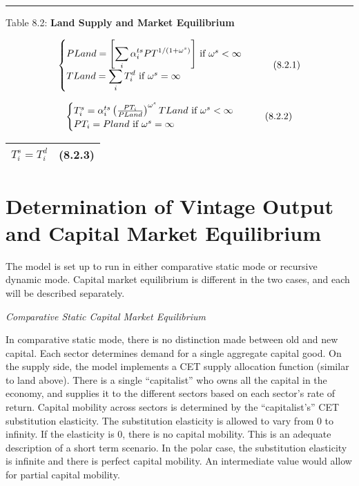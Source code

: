 \documentclass{article}
\begin{document}
\noindent\rule{\linewidth}{0.4pt}
\begin{center}
\begin{large}
{\centering Table 8.2: \textbf{Land Supply and Market Equilibrium} \par}

\begin{equation}
    \begin{cases}
      $$PLand = \left[\displaystyle \sum_i \alpha^{ts}_i PT^{1/(1+\omega^s)} \right]$$ \text{ if } $$\omega^s < \infty$$\\
      $$TLand = \displaystyle \sum_i T^d_i$$ \text{ if } $$\omega^s = \infty$$\\
    \end{cases}       
    \tag{8.2.1}
\end{equation}

\begin{equation}
    \begin{cases}
      $$T^s_i = \alpha^{ts}_i \left(\frac{PT_i}{PLand} \right)^{\omega^s} TLand$$ \text{ if } $$\omega^s < \infty$$\\
      $$PT_i = Pland$$ \text{ if } $$\omega^s = \infty$$\\
    \end{cases}       
    \tag{8.2.2}
\end{equation}

\begin{tabular}{>{\raggedright}p{} l}

$T^s_i = T^d_i$ & (8.2.3)\\[15pt]

\hline
\end{tabular}
\end{large}
\end{center}

\section{Determination of Vintage Output and Capital Market Equilibrium}

The model is set up to run in either comparative static mode or recursive dynamic mode. Capital market equilibrium is different in the two cases, and each will be described separately.

\textit{Comparative Static Capital Market Equilibrium}

In comparative static mode, there is no distinction made between old and new capital. Each sector determines demand for a single aggregate capital good. On the supply side, the model implements a CET supply allocation function (similar to land above). There is a single “capitalist” who owns all the capital in the economy, and supplies it to the different sectors based on each sector’s rate of return. Capital mobility across sectors is determined by the “capitalist’s” CET substitution elasticity. The substitution elasticity is allowed to vary from 0 to infinity. If the elasticity is 0, there is no capital mobility. This is an adequate description of a short term scenario. In the polar case, the substitution elasticity is infinite and there is perfect capital mobility. An intermediate value would allow for partial capital mobility.
\end{document}

